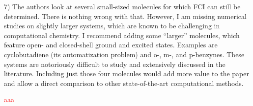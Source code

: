 \documentclass[10pt]{letter}
\newcommand{\alert}[1]{\textcolor{red}{#1}}
\begin{document}
\begin{letter}
{7) The authors look at several small-sized molecules for which FCI can still be determined. There is nothing wrong with that. However, I am missing numerical studies on slightly larger systems, which are known to be challenging in computational chemistry. I recommend adding some ``larger'' molecules, which feature open- and closed-shell ground and excited states. Examples are cyclobutadiene (its automatization problem) and o-, m-, and p-benzynes. These systems are notoriously difficult to study and extensively discussed in the literature. Including just those four molecules would add more value to the paper and allow a direct comparison to other state-of-the-art computational methods.
}

\alert{
aaa
}

\end{letter}
\end{document}
